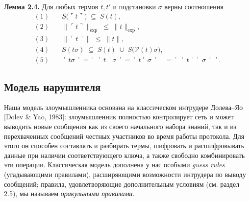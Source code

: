 \medskip
\noindent\textbf{Лемма 2.4.} Для любых термов \(t,t'\) и подстановки \(\sigma\) верны соотношения
\[
\begin{aligned}
(1)\quad & S\bigl(\ulcorner t\urcorner\bigr)\;\subseteq\;S(t),\\
(2)\quad & \bigl\lVert\ulcorner t\urcorner\bigr\rVert_{\mathrm{exp}}
           \;\le\;\lVert t\rVert_{\mathrm{exp}},\\
(3)\quad & \bigl\lVert\ulcorner t\urcorner\bigr\rVert
           \;\le\;\lVert t\rVert,\\
(4)\quad & S(t\sigma)\;\subseteq\;S(t)\;\cup\;S\bigl(\mathcal V(t)\sigma\bigr),\\
(5)\quad & \ulcorner t\sigma\urcorner
           = \ulcorner \ulcorner t\urcorner\sigma\urcorner
           = \ulcorner t\ulcorner\sigma\urcorner\urcorner
           = \ulcorner\ulcorner t\urcorner\ulcorner\sigma\urcorner\urcorner.
\end{aligned}
\]

\subsection{Модель нарушителя}

Наша модель злоумышленника основана на классическом интрудере Долева–Яо [Dolev \& Yao, 1983]: злоумышленник полностью контролирует сеть и может
выводить новые сообщения как из своего начального набора знаний, так и из перехваченных сообщений честных участников во время работы протокола.
Для этого он способен составлять и разбирать термы, шифровать и расшифровывать данные при наличии соответствующего ключа, а также свободно
комбинировать эти операции. Классическая модель дополнена у нас особыми \emph{guess rules} (угадывающими правилами), расширяющими возможности
интрудера по выводу сообщений; правила, удовлетворяющие дополнительным условиям (см. раздел 2.5), мы называем \emph{оракульными правилами}.

